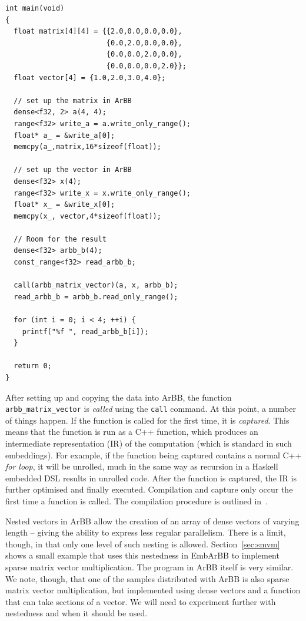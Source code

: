 \begin{Verbatim} 
int main(void)
{
  float matrix[4][4] = {{2.0,0.0,0.0,0.0},
                        {0.0,2.0,0.0,0.0},
                        {0.0,0.0,2.0,0.0},
                        {0.0,0.0,0.0,2.0}};
  float vector[4] = {1.0,2.0,3.0,4.0}; 

  // set up the matrix in ArBB 
  dense<f32, 2> a(4, 4);
  range<f32> write_a = a.write_only_range();
  float* a_ = &write_a[0];
  memcpy(a_,matrix,16*sizeof(float));

  // set up the vector in ArBB 
  dense<f32> x(4);
  range<f32> write_x = x.write_only_range();
  float* x_ = &write_x[0];
  memcpy(x_, vector,4*sizeof(float));

  // Room for the result
  dense<f32> arbb_b(4);
  const_range<f32> read_arbb_b;

  call(arbb_matrix_vector)(a, x, arbb_b);
  read_arbb_b = arbb_b.read_only_range();

  for (int i = 0; i < 4; ++i) {
    printf("%f ", read_arbb_b[i]);
  }
 
  return 0;
}
\end{Verbatim}

After setting up and copying the data into ArBB, the function {\tt arbb\_matrix\_vector} 
is {\em called} using the {\tt call} command. At this point, a number of
things happen. If the function is called for the first time, it is 
{\em captured}. This means that the function is run as a C++ function, which produces 
an intermediate representation (IR) of the computation (which is standard in such embeddings).
For example, if the function being captured contains a normal C++ {\em for loop}, it will be unrolled, much in the same way as recursion in a
Haskell embedded DSL results in unrolled code. After the function is captured, 
the IR is further optimised and finally executed. Compilation and capture 
only occur the first time a function is called. The compilation procedure
is outlined in~\cite{ARBB2011}.

Nested vectors in ArBB allow the creation of an array of dense vectors of varying length -- giving the ability to express less regular parallelism. There is a limit, though, in that only one level of such nesting is allowed. Section~\ref{sec:smvm} shows a small example that uses this nestedness in EmbArBB to implement sparse matrix vector multiplication. The program in ArBB itself is very similar. We note, though, that one of the samples distributed with ArBB is also sparse matrix vector multiplication, but implemented using dense vectors and a function that can take sections of a vector. We will need to experiment further with nestedness and when it should be used.

